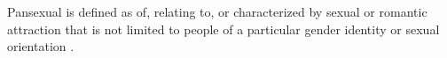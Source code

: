 Pansexual is defined as of, relating to, or characterized by sexual or romantic 
attraction that is not limited to people of a particular gender identity or 
sexual orientation \cite{pansexual-def}.

